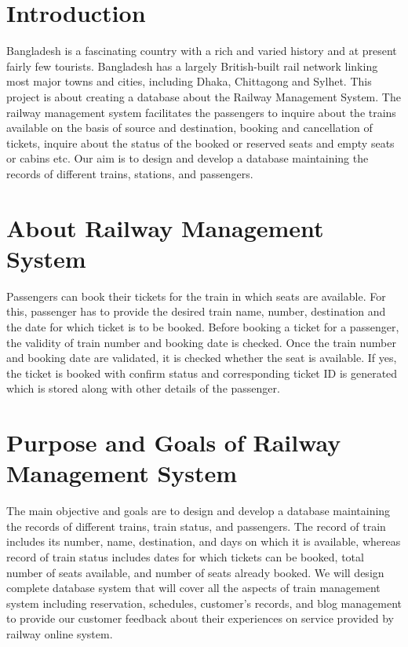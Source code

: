 \documentclass{article}
\begin{document}
\section{Introduction}
 Bangladesh is a fascinating country with a rich and varied history and at present fairly few tourists.  Bangladesh has a largely British-built rail network linking most major towns and cities, including Dhaka, Chittagong and Sylhet. This project is about creating a database about the Railway Management System. The railway management system facilitates the passengers to inquire about the trains available on the basis of source and destination, booking and cancellation of tickets, inquire about the status of the booked or reserved seats and empty seats or cabins etc. Our aim is to design and develop a database maintaining the records of different trains, stations, and passengers.
 \section{About Railway Management System}
 Passengers can book their tickets for the train in which seats are available. For this, passenger has to provide the desired train name, number, destination and the date for which ticket is to be booked. Before booking a ticket for a passenger, the validity of train number and booking date is checked. Once the train number and booking date are validated, it is checked whether the seat is available. If yes, the ticket is booked with conﬁrm status and corresponding ticket ID is generated which is stored along with other details of the passenger. 
 \section{Purpose and Goals of Railway Management System}
 The main objective and goals are to design and develop a database maintaining the records of different trains, train status, and passengers. The record of train includes its number, name, destination, and days on which it is available, whereas record of train status includes dates for which tickets can be booked, total number of seats available, and number of seats already booked.	We will design complete database system that will cover all the aspects of train management system including reservation, schedules, customer’s records, and blog management to provide our customer feedback about their experiences on service provided by railway online system.
 
\end{document}
